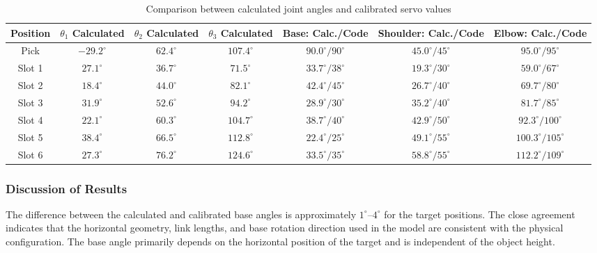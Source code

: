\begin{table}[htbp]
    \centering
    \caption{Comparison between calculated joint angles and calibrated servo values}
    \label{tab:angle_comparison}
    \begin{tabular}{c c c c c c c}
        \toprule
        Position &
        $\theta_1$ Calculated &
        $\theta_2$ Calculated &
        $\theta_3$ Calculated &
        Base: Calc./Code &
        Shoulder: Calc./Code &
        Elbow: Calc./Code \\
        \midrule
        Pick  & $-29.2^\circ$ & $62.4^\circ$ & $107.4^\circ$ & $90.0^\circ/90^\circ$ & $45.0^\circ/45^\circ$ & $95.0^\circ/95^\circ$ \\
        Slot 1 & $27.1^\circ$ & $36.7^\circ$ & $71.5^\circ$ & $33.7^\circ/38^\circ$ & $19.3^\circ/30^\circ$ & $59.0^\circ/67^\circ$ \\
        Slot 2 & $18.4^\circ$ & $44.0^\circ$ & $82.1^\circ$ & $42.4^\circ/45^\circ$ & $26.7^\circ/40^\circ$ & $69.7^\circ/80^\circ$ \\
        Slot 3 & $31.9^\circ$ & $52.6^\circ$ & $94.2^\circ$ & $28.9^\circ/30^\circ$ & $35.2^\circ/40^\circ$ & $81.7^\circ/85^\circ$ \\
        Slot 4 & $22.1^\circ$ & $60.3^\circ$ & $104.7^\circ$ & $38.7^\circ/40^\circ$ & $42.9^\circ/50^\circ$ & $92.3^\circ/100^\circ$ \\
        Slot 5 & $38.4^\circ$ & $66.5^\circ$ & $112.8^\circ$ & $22.4^\circ/25^\circ$ & $49.1^\circ/55^\circ$ & $100.3^\circ/105^\circ$ \\
        Slot 6 & $27.3^\circ$ & $76.2^\circ$ & $124.6^\circ$ & $33.5^\circ/35^\circ$ & $58.8^\circ/55^\circ$ & $112.2^\circ/109^\circ$ \\
        \bottomrule
    \end{tabular}
\end{table}

\subsubsection{Discussion of Results}

The difference between the calculated and calibrated base angles is approximately $1^\circ$--$4^\circ$ for the target positions. The close agreement indicates that the horizontal geometry, link lengths, and base rotation direction used in the model are consistent with the physical configuration. The base angle primarily depends on the horizontal position of the target and is independent of the object height.

